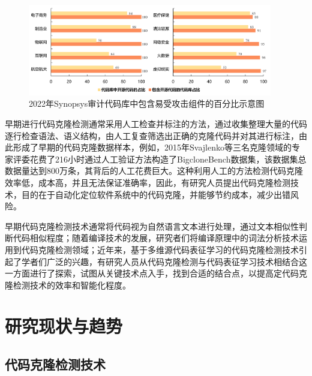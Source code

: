 \begin{figure}[H]
    \centering
    \includegraphics[width=0.95\textwidth]{figures/assembly}
    \caption{2022年Synopsys审计代码库中包含易受攻击组件的百分比示意图}
    \label{fig:assembly}
\end{figure}

早期进行代码克隆检测通常采用人工检查并标注的方法，通过收集整理大量的代码逐行检查语法、语义结构，由人工复查筛选出正确的克隆代码并对其进行标注，由此形成了早期的代码克隆数据样本，例如，2015年Svajlenko\cite{7332459}等三名克隆领域的专家评委花费了216小时通过人工验证方法构造了BigcloneBench数据集，该数据集总数据量达到800万条，其背后的人工花费巨大。这种利用人工的方法检测代码克隆效率低，成本高，并且无法保证准确率\cite{7965429}，因此，有研究人员提出代码克隆检测技术，目的在于自动化定位软件系统中的代码克隆，并能够节约成本，减少出错风险\cite{Yang2015ClassificationMF}。

早期代码克隆检测技术通常将代码视为自然语言文本进行处理，通过文本相似性判断代码相似程度；随着编译技术的发展，研究者们将编译原理中的词法分析技术运用到代码克隆检测领域；近年来，基于多维源代码表征学习的代码克隆检测技术引起了学者们广泛的兴趣，有研究人员从代码克隆检测与代码表征学习技术相结合这一方面进行了探索，试图从关键技术点入手，找到合适的结合点，以提高定代码克隆检测技术的效率和智能化程度。


\section{研究现状与趋势}
\label{sec:status}

\subsection{代码克隆检测技术}
\label{subsec:Code clone detection}

